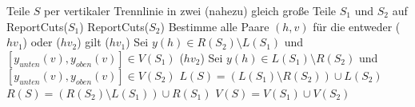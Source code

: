 \documentclass{article}
\begin{document}
\begin{algorithm}[ht]
{    \BlankLine\BlankLine%
    Teile $S$ per vertikaler Trennlinie in zwei (nahezu) gleich gro{\ss}e Teile $S_1$ und $S_2$ auf\;%
    \BlankLine\BlankLine%
    ReportCuts($S_1$)\;%
    ReportCuts($S_2$)\;%
    \BlankLine\BlankLine%
    Bestimme alle Paare $(h, v)$ f{\"u}r die entweder ($hv_1$) oder ($hv_2$) gilt\;
    \Begin($hv_1$){%
      Sei $y(h)\in R(S_2) \setminus L(S_1)$ und $[y_{unten}(v), y_{oben}(v)]\in V(S_1)$\;%
    }
    \BlankLine\BlankLine%
    \Begin($hv_2$){%
      Sei $y(h)\in L(S_1) \setminus R(S_2)$ und $[y_{unten}(v), y_{oben}(v)]\in V(S_2)$\;%
    }
    \BlankLine\BlankLine%
    $L(S) = \left( L(S_1) \setminus R(S_2) \right) \cup L(S_2)$\;
    $R(S) = \left( R(S_2) \setminus L(S_1) \right) \cup R(S_1)$\;
    $V(S) = V(S_1) \cup V(S_2)$\;
  }%
\end{algorithm}
\end{document}
